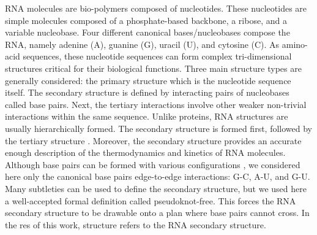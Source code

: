 \documentclass[a4paper,12pt]{article}
\begin{document}
RNA molecules are bio-polymers composed of nucleotides. These nucleotides are
simple molecules composed of a phosphate-based backbone, a ribose, and a
variable nucleobase. Four different canonical bases/nucleobases compose the RNA,
namely adenine (A), guanine (G), uracil (U), and cytosine (C). As amino-acid
sequences, these nucleotide sequences can form complex tri-dimensional
structures critical for their biological functions. Three main structure types
are generally considered: the primary structure which is the nucleotide sequence
itself. The secondary structure is defined by interacting pairs of nucleobases
called base pairs. Next, the tertiary interactions involve other weaker
non-trivial interactions within the same sequence. Unlike proteins, RNA
structures are usually hierarchically formed. The secondary structure is formed
first, followed by the tertiary structure \cite{tinoco99_how_rna_folds}. Moreover,
the secondary structure provides an accurate enough description of the
thermodynamics and kinetics of RNA molecules. Although base pairs can be formed
with various configurations \cite{leontis01_geomet_nomen_class_rna_base_pairs}, we
considered here only the canonical base pairs edge-to-edge interactions: G-C,
A-U, and G-U. Many subtleties can be used to define the secondary structure, but
we used here a well-accepted formal definition called pseudoknot-free. This
forces the RNA secondary structure to be drawable onto a plan where base pairs
cannot cross. In the res of this work, structure refers to the RNA secondary
structure.
\end{document}
